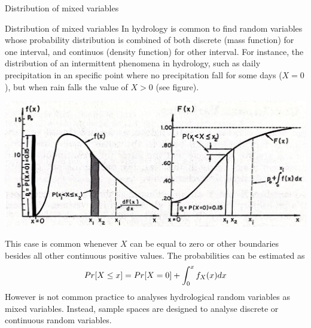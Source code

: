 \documentclass[8pt]{beamer}
\begin{document}
\begin{frame}{Distribution of mixed variables} 
    \begin{block}{Distribution of mixed variables} 
        In hydrology is common to find random variables whose probability distribution is combined of both discrete (mass function) for one interval, and continuos (density function) for other interval. For instance, the distribution of an intermittent phenomena in hydrology, such as daily precipitation in an specific point where no precipitation fall for some days ($X = 0$), but when rain falls the value of $X > 0$ (see figure).

            \includegraphics[width=0.8\linewidth]{fiV24.jpeg} %

            This case is common whenever $X$ can be equal to zero or other boundaries besides all other continuous positive values. The probabilities can be estimated as 
            \[
            Pr[X\leq x] = Pr[X=0] + \int_{0}^{x} f_X (x) dx
            \vspace{-6pt}
        \]
        However is not common practice to analyses hydrological random variables as mixed variables. Instead, sample spaces are designed to analyse discrete or continuous random variables. 
    \end{block}
\end{frame}
\end{document}
